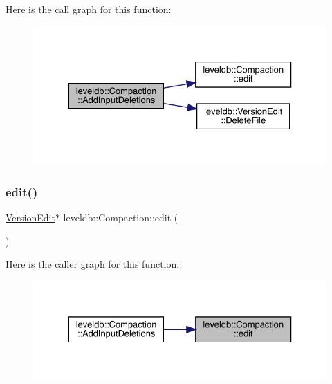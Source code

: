 Here is the call graph for this function\+:
\nopagebreak
\begin{figure}[H]
\begin{center}
\leavevmode
\includegraphics[width=329pt]{classleveldb_1_1_compaction_abb1acdc9b882a7497603b13386e7e1a7_cgraph}
\end{center}
\end{figure}
\mbox{\label{classleveldb_1_1_compaction_a122e4f7b4fdb6c0d1862624742b34b3d}} 
\subsubsection{\texorpdfstring{edit()}{edit()}}
{\footnotesize\ttfamily \mbox{\hyperlink{classleveldb_1_1_version_edit}{Version\+Edit}}$\ast$ leveldb\+::\+Compaction\+::edit (\begin{DoxyParamCaption}{ }\end{DoxyParamCaption})\hspace{0.3cm}{\ttfamily [inline]}}

Here is the caller graph for this function\+:
\nopagebreak
\begin{figure}[H]
\begin{center}
\leavevmode
\includegraphics[width=329pt]{classleveldb_1_1_compaction_a122e4f7b4fdb6c0d1862624742b34b3d_icgraph}
\end{center}
\end{figure}
\mbox{\label{classleveldb_1_1_compaction_aa0999bbaeb6993759b3e76e3516589d3}} 
